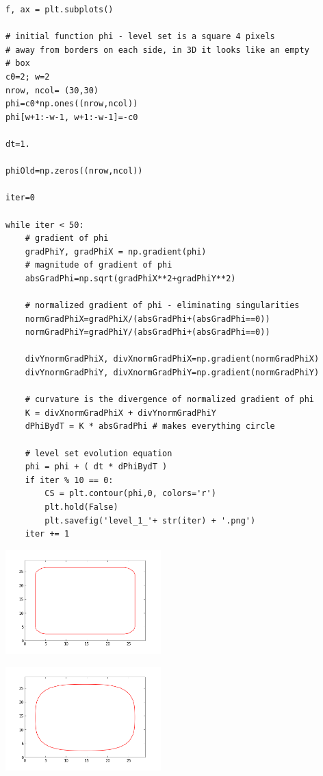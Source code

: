 \documentclass[12pt,fleqn]{article}\usepackage{../common}
\begin{document}
\begin{verbatim}
f, ax = plt.subplots()

# initial function phi - level set is a square 4 pixels
# away from borders on each side, in 3D it looks like an empty
# box
c0=2; w=2
nrow, ncol= (30,30)
phi=c0*np.ones((nrow,ncol))
phi[w+1:-w-1, w+1:-w-1]=-c0

dt=1.

phiOld=np.zeros((nrow,ncol))

iter=0

while iter < 50:
    # gradient of phi
    gradPhiY, gradPhiX = np.gradient(phi)
    # magnitude of gradient of phi
    absGradPhi=np.sqrt(gradPhiX**2+gradPhiY**2)                               
    
    # normalized gradient of phi - eliminating singularities
    normGradPhiX=gradPhiX/(absGradPhi+(absGradPhi==0))
    normGradPhiY=gradPhiY/(absGradPhi+(absGradPhi==0))
    
    divYnormGradPhiX, divXnormGradPhiX=np.gradient(normGradPhiX)
    divYnormGradPhiY, divXnormGradPhiY=np.gradient(normGradPhiY)
                           
    # curvature is the divergence of normalized gradient of phi
    K = divXnormGradPhiX + divYnormGradPhiY
    dPhiBydT = K * absGradPhi # makes everything circle
    
    # level set evolution equation    
    phi = phi + ( dt * dPhiBydT )
    if iter % 10 == 0: 
        CS = plt.contour(phi,0, colors='r')
        plt.hold(False)
        plt.savefig('level_1_'+ str(iter) + '.png')
    iter += 1
\end{verbatim}

\includegraphics[height=4cm]{level_1_0.png}

\includegraphics[height=4cm]{level_1_10.png}
\end{document}

